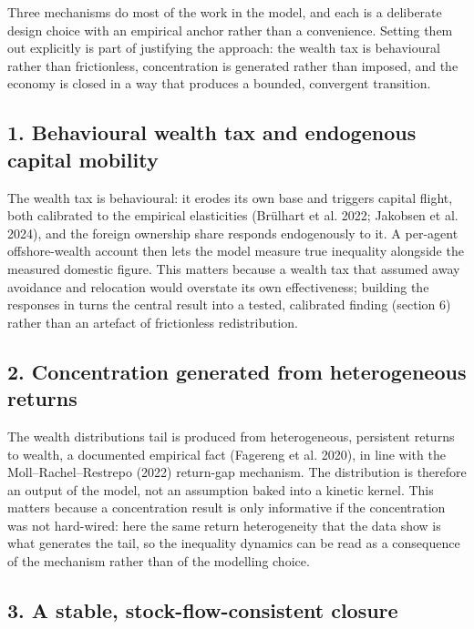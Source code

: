 \documentclass[11pt]{article}
\begin{document}
Three mechanisms do most of the work in the model, and each is a
deliberate design choice with an empirical anchor rather than a
convenience. Setting them out explicitly is part of justifying the
approach: the wealth tax is behavioural rather than frictionless,
concentration is generated rather than imposed, and the economy is
closed in a way that produces a bounded, convergent transition.

\hypertarget{behavioural-wealth-tax-and-endogenous-capital-mobility}{%
\subsection{1. Behavioural wealth tax and endogenous capital
mobility}\label{behavioural-wealth-tax-and-endogenous-capital-mobility}}

The wealth tax is behavioural: it erodes its own base and triggers
capital flight, both calibrated to the empirical elasticities (Brülhart
et al. 2022; Jakobsen et al. 2024), and the foreign ownership share
responds endogenously to it. A per-agent offshore-wealth account then
lets the model measure true inequality alongside the measured domestic
figure. This matters because a wealth tax that assumed away avoidance
and relocation would overstate its own effectiveness; building the
responses in turns the central result into a tested, calibrated finding
(section 6) rather than an artefact of frictionless redistribution.

\hypertarget{concentration-generated-from-heterogeneous-returns}{%
\subsection{2. Concentration generated from heterogeneous
returns}\label{concentration-generated-from-heterogeneous-returns}}

The wealth distribution\textquotesingle s tail is produced from
heterogeneous, persistent returns to wealth, a documented empirical fact
(Fagereng et al. 2020), in line with the Moll--Rachel--Restrepo (2022)
return-gap mechanism. The distribution is therefore an output of the
model, not an assumption baked into a kinetic kernel. This matters
because a concentration result is only informative if the concentration
was not hard-wired: here the same return heterogeneity that the data
show is what generates the tail, so the inequality dynamics can be read
as a consequence of the mechanism rather than of the modelling choice.

\hypertarget{a-stable-stock-flow-consistent-closure}{%
\subsection{3. A stable, stock-flow-consistent
closure}\label{a-stable-stock-flow-consistent-closure}}
\end{document}
